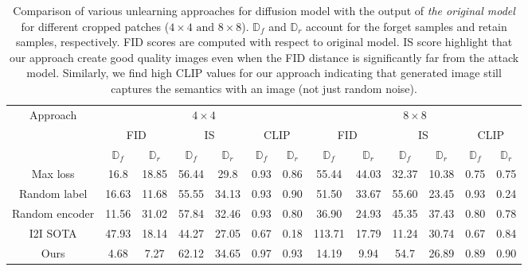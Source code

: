 \begin{table*}[h]
    \centering
    \begin{tabular}{ccccccc||cccccc}
      \toprule
      \multirow{3}{*}{Approach} & \multicolumn{6}{c||}{$4\times4$} & \multicolumn{6}{c}{$8\times8$} \\
      & \multicolumn{2}{c}{FID} & \multicolumn{2}{c}{IS} & \multicolumn{2}{c||}{CLIP} & \multicolumn{2}{c}{FID} & \multicolumn{2}{c}{IS} & \multicolumn{2}{c}{CLIP} \\ \cline{2-13}
      & $\mathbb{D}_f$ & $\mathbb{D}_r$ & $\mathbb{D}_f$ & $\mathbb{D}_r$ & $\mathbb{D}_f$ & $\mathbb{D}_r$ & $\mathbb{D}_f$ & $\mathbb{D}_r$ & $\mathbb{D}_f$ & $\mathbb{D}_r$ & $\mathbb{D}_f$ & $\mathbb{D}_r$ \\
      \hline
      Max loss & 16.8 & 18.85 & 56.44 & 29.8 & 0.93 & 0.86 & 55.44 & 44.03 & 32.37 & 10.38 & 0.75 & 0.75 \\
      Random label & 16.63 & 11.68 & 55.55 & 34.13 & 0.93 & 0.90 & 51.50 & 33.67 & 55.60 & 23.45 & 0.93 & 0.24 \\
      Random encoder & 11.56 & 31.02 & 57.84 & 32.46 & 0.93 & 0.80 & 36.90 & 24.93 & 45.35 & 37.43 & 0.80 & 0.78 \\
      I2I SOTA & 47.93 & 18.14 & 44.27 & 27.05 & 0.67 & 0.18 & 113.71 & 17.79 & 11.24 & 30.74 & 0.67 & 0.84 \\
      Ours & 4.68 & 7.27 & 62.12 & 34.65 & 0.97 & 0.93 & 14.19 & 9.94 & 54.7 & 26.89 & 0.89 & 0.90 \\
      \bottomrule
    \end{tabular}
    \caption{Comparison of various unlearning approaches for diffusion model with the output of \textit{the original model} for different cropped patches ($4 \times 4 \text{ and } 8\times8$). $\mathbb{D}_f$ and $\mathbb{D}_r$ account for the forget samples and retain samples, respectively. FID scores are computed with respect to original model. IS score highlight that our approach create good quality images even when the FID distance is significantly far from the attack model. Similarly, we find high CLIP values for our approach indicating that generated image still captures the semantics with an image (not just random noise).}
    \label{tab:diff_model_orig_results}
\end{table*}

